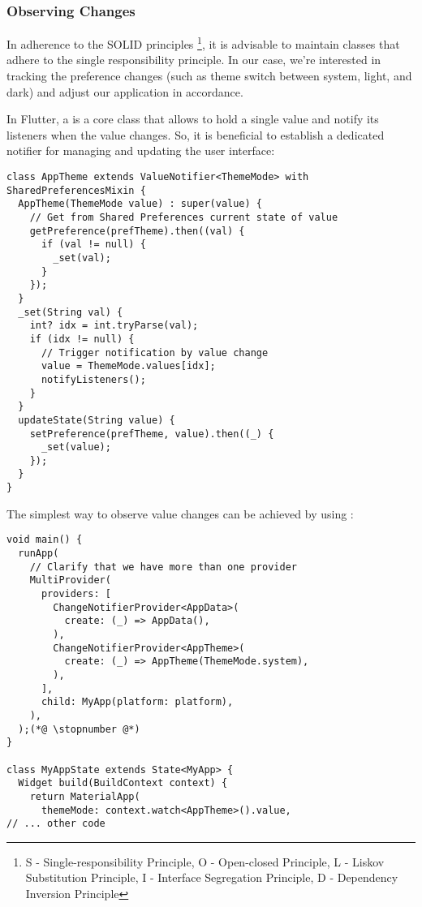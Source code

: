 \subsubsection{Observing Changes}

In adherence to the SOLID principles \footnote{S - Single-responsibility Principle, O - Open-closed Principle, L - 
Liskov Substitution Principle, I - Interface Segregation Principle, D - Dependency Inversion Principle}, it is advisable 
to maintain classes that adhere to the single responsibility principle. In our case, we're interested in tracking the 
preference changes (such as theme switch between system, light, and dark) and adjust our application in accordance.

In Flutter, a  is a core class that allows to hold a single value and notify its listeners when the 
value changes. So, it is beneficial to establish a dedicated notifier for managing and updating the user interface:

\begin{lstlisting}
class AppTheme extends ValueNotifier<ThemeMode> with SharedPreferencesMixin {
  AppTheme(ThemeMode value) : super(value) {
    // Get from Shared Preferences current state of value
    getPreference(prefTheme).then((val) {
      if (val != null) {
        _set(val);
      }
    });
  }
  _set(String val) {
    int? idx = int.tryParse(val);
    if (idx != null) {
      // Trigger notification by value change
      value = ThemeMode.values[idx];
      notifyListeners();
    }
  }
  updateState(String value) {
    setPreference(prefTheme, value).then((_) {
      _set(value);
    });
  }
}
\end{lstlisting}

\noindent The simplest way to observe value changes can be achieved by using :

\begin{lstlisting}
void main() {
  runApp(
    // Clarify that we have more than one provider
    MultiProvider(
      providers: [
        ChangeNotifierProvider<AppData>(
          create: (_) => AppData(),
        ),
        ChangeNotifierProvider<AppTheme>(
          create: (_) => AppTheme(ThemeMode.system),
        ),
      ],
      child: MyApp(platform: platform),
    ),
  );(*@ \stopnumber @*)
}

class MyAppState extends State<MyApp> {
  Widget build(BuildContext context) {
    return MaterialApp(
      themeMode: context.watch<AppTheme>().value,
// ... other code
\end{lstlisting}

